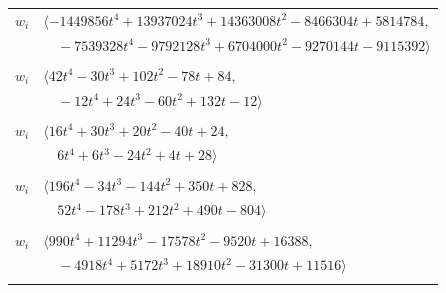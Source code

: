 \documentclass[11pt]{article}
\begin{document}
\begin{longtable}{@{}ll@{}}
$w_i$ & $\langle -1449856t^{4}+13937024t^{3}+14363008t^{2}-8466304t+5814784,$\\
 & $\quad -7539328t^{4}-9792128t^{3}+6704000t^{2}-9270144t-9115392\rangle$\\
\addlinespace[2pt]
\multicolumn{2}{@{}p{0.97\textwidth}@{}}{$i=67$, $D_i=1$, $\rho_{ij}$: $0{:}3, \allowbreak 4{:}2, \allowbreak 5{:}1, \allowbreak 17{:}1, \allowbreak 26{:}3, \allowbreak 28{:}1, \allowbreak 38{:}3, \allowbreak 51{:}2, \allowbreak 58{:}3, \allowbreak 62{:}2, \allowbreak 65{:}1, \allowbreak 77{:}3$}\\
$w_i$ & $\langle 42t^{4}-30t^{3}+102t^{2}-78t+84,$\\
 & $\quad -12t^{4}+24t^{3}-60t^{2}+132t-12\rangle$\\
\addlinespace[2pt]
\multicolumn{2}{@{}p{0.97\textwidth}@{}}{$i=68$, $D_i=1$, $\rho_{ij}$: $3{:}2, \allowbreak 16{:}3, \allowbreak 20{:}3, \allowbreak 22{:}2, \allowbreak 24{:}3, \allowbreak 26{:}1, \allowbreak 32{:}2, \allowbreak 36{:}3, \allowbreak 58{:}1, \allowbreak 62{:}2$}\\
$w_i$ & $\langle 16t^{4}+30t^{3}+20t^{2}-40t+24,$\\
 & $\quad 6t^{4}+6t^{3}-24t^{2}+4t+28\rangle$\\
\addlinespace[2pt]
\multicolumn{2}{@{}p{0.97\textwidth}@{}}{$i=69$, $D_i=1$, $\rho_{ij}$: $0{:}3, \allowbreak 2{:}3, \allowbreak 10{:}1, \allowbreak 11{:}2, \allowbreak 13{:}2, \allowbreak 14{:}1, \allowbreak 15{:}3, \allowbreak 16{:}1, \allowbreak 21{:}2, \allowbreak 25{:}1, \allowbreak 26{:}2, \allowbreak 27{:}3, \allowbreak 33{:}2, \allowbreak 36{:}3, \allowbreak 49{:}3, \allowbreak 70{:}3$}\\
$w_i$ & $\langle 196t^{4}-34t^{3}-144t^{2}+350t+828,$\\
 & $\quad 52t^{4}-178t^{3}+212t^{2}+490t-804\rangle$\\
\addlinespace[2pt]
\multicolumn{2}{@{}p{0.97\textwidth}@{}}{$i=70$, $D_i=1$, $\rho_{ij}$: $8{:}2, \allowbreak 10{:}3, \allowbreak 11{:}3, \allowbreak 19{:}2, \allowbreak 24{:}3, \allowbreak 31{:}2, \allowbreak 35{:}1, \allowbreak 41{:}1, \allowbreak 42{:}3, \allowbreak 46{:}2, \allowbreak 48{:}3, \allowbreak 50{:}1, \allowbreak 57{:}2, \allowbreak 62{:}2, \allowbreak 69{:}1$}\\
$w_i$ & $\langle 990t^{4}+11294t^{3}-17578t^{2}-9520t+16388,$\\
 & $\quad -4918t^{4}+5172t^{3}+18910t^{2}-31300t+11516\rangle$\\
\addlinespace[2pt]
\multicolumn{2}{@{}p{0.97\textwidth}@{}}{$i=71$, $D_i=1$, $\rho_{ij}$: $2{:}3, \allowbreak 13{:}2, \allowbreak 18{:}2, \allowbreak 25{:}2, \allowbreak 26{:}3, \allowbreak 27{:}3, \allowbreak 28{:}2, \allowbreak 29{:}2, \allowbreak 52{:}3, \allowbreak 53{:}3, \allowbreak 54{:}1, \allowbreak 77{:}3$}\\

\end{longtable}
\end{document}
